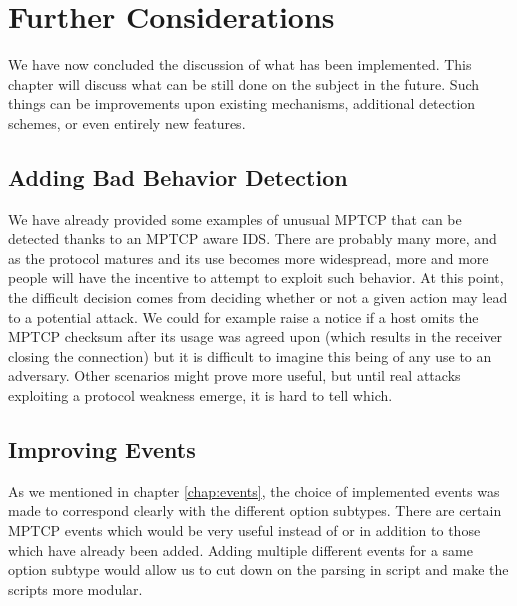 


\chapter{Further Considerations} \label{chap:further}
We have now concluded the discussion of what has been implemented. This chapter will discuss what can be still done on the subject in the future. Such things can be improvements upon existing mechanisms, additional detection schemes, or even entirely new features.

\section{Adding Bad Behavior Detection}
We have already provided some examples of unusual MPTCP that can be detected thanks to an MPTCP aware IDS. There are probably many more, and as the protocol matures and its use becomes more widespread, more and more people will have the incentive to attempt to exploit such behavior. At this point, the difficult decision comes from deciding whether or not a given action may lead to a potential attack. We could for example raise a notice if a host omits the MPTCP checksum after its usage was agreed upon (which results in the receiver closing the connection) but it is difficult to imagine this being of any use to an adversary. Other scenarios might prove more useful, but until real attacks exploiting a protocol weakness emerge, it is hard to tell which.

\section{Improving Events} 
As we mentioned in chapter \ref{chap:events}, the choice of implemented events was made to correspond clearly with the different option subtypes. There are certain MPTCP events which would be very useful instead of or in addition to those which have already been added. Adding multiple different events for a same option subtype would allow us to cut down on the parsing in script and make the scripts more modular. \\

